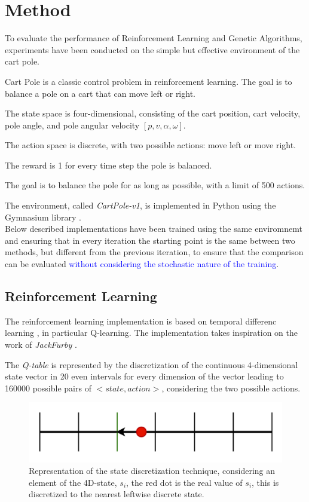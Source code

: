 \section{Method}
To evaluate the performance of Reinforcement Learning and Genetic Algorithms,
experiments have been conducted on the simple but effective environment of the cart pole.

Cart Pole is a classic control problem in reinforcement learning. 
The goal is to balance a pole on a cart that can move left or right. 

The state space is four-dimensional, consisting of the cart position, cart velocity, pole angle, and pole angular velocity $[p, v, \alpha, \omega]$. 

The action space is discrete, with two possible actions: move left or move right. 

The reward is 1 for every time step the pole is balanced.

The goal is to balance the pole for as long as possible, with a limit of 500 actions.

The environment, called \textit{CartPole-v1}, is implemented in Python using the Gymnasium library \cite{towers_gymnasium_2023}.
\\
Below described implementations have been trained using the same enviromnemt and ensuring that in every iteration the starting point is the same between two methods, but different from the previous iteration, to ensure that the comparison can be evaluated \textcolor{blue}{without considering the stochastic nature of the training}.

\subsection{Reinforcement Learning}
The reinforcement learning implementation is based on temporal differenc learning \cite{sutton1998temporal}, 
in particular Q-learning.
The implementation takes inspiration on the work of \textit{JackFurby} \cite{JackFurbyCartPole}.

The \textit{Q-table} is represented by the discretization of the continuous 4-dimensional state vector in 20 even intervals for every dimension of the vector leading to 160000 possible pairs of $<state,action>$, considering the two possible actions.

\begin{figure}[H]
	\centering
	\includegraphics [scale = 0.2]{Images/state_discretization.png}
	\caption{Representation of the state discretization technique, considering an element of the 4D-state, $s_i$, the red dot is the real value of $s_i$, this is discretized to the nearest leftwise discrete state.}
	\label{figDISC}
\end{figure}

